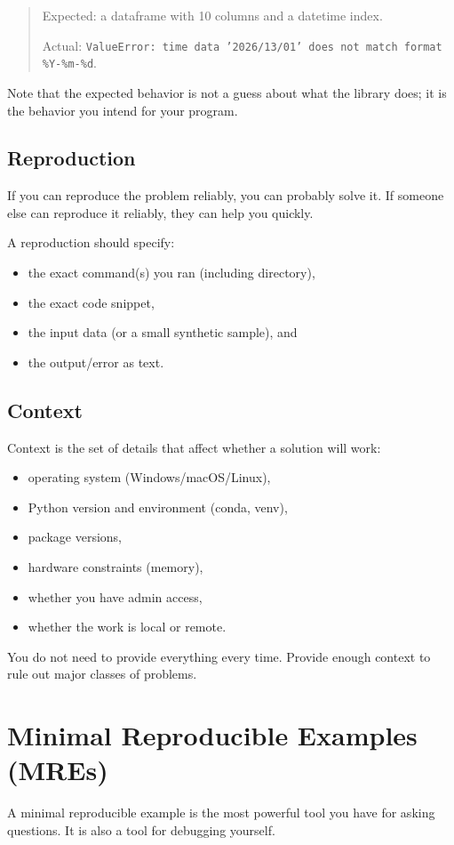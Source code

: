 \begin{quote}
Expected: a dataframe with 10 columns and a datetime index.

Actual: \texttt{ValueError: time data '2026/13/01' does not match format \%Y-\%m-\%d}.
\end{quote}

Note that the expected behavior is not a guess about what the library does; it is the behavior you intend for your program.

\subsection{Reproduction}
If you can reproduce the problem reliably, you can probably solve it. If someone else can reproduce it reliably, they can help you quickly.

A reproduction should specify:
\begin{itemize}[noitemsep]
  \item the exact command(s) you ran (including directory),
  \item the exact code snippet,
  \item the input data (or a small synthetic sample), and
  \item the output/error as text.
\end{itemize}

\subsection{Context}
Context is the set of details that affect whether a solution will work:
\begin{itemize}[noitemsep]
  \item operating system (Windows/macOS/Linux),
  \item Python version and environment (conda, venv),
  \item package versions,
  \item hardware constraints (memory),
  \item whether you have admin access,
  \item whether the work is local or remote.
\end{itemize}

You do not need to provide everything every time. Provide enough context to rule out major classes of problems.

\section{Minimal Reproducible Examples (MREs)}
A minimal reproducible example is the most powerful tool you have for asking questions. It is also a tool for debugging yourself.

